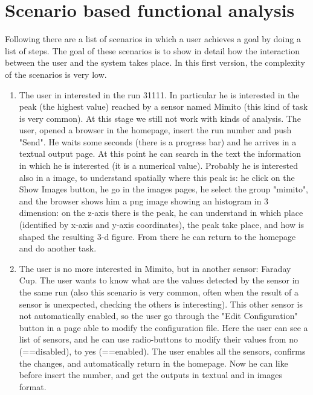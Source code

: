 \section{Scenario based functional analysis}

Following there are a list of scenarios in which a user achieves a goal by doing a list of steps. The goal of these scenarios is to show in detail how the interaction between the user and the system takes place. In this first version, the complexity of the scenarios is very low. 

\begin{enumerate}

\item The user in interested in the run 31111. In particular he is interested in the peak (the highest value) reached by a sensor named Mimito (this kind of task is very common). At this stage we still not work with kinds of analysis. The user, opened a browser in the homepage, insert the run number and push "Send". He waits some seconds (there is a progress bar) and he arrives in a textual output page. At this point he can search in the text the information in which he is interested (it is a numerical value). Probably he is interested also in a image, to understand spatially where this peak is: he click on the Show Images button, he go in the images pages, he select the group "mimito", and the browser shows him a png image showing an histogram in 3 dimension: on the z-axis there is the peak, he can understand in which place (identified by x-axis and y-axis coordinates), the peak take place, and how is shaped the resulting 3-d figure. From there he can return to the homepage and do another task.   

\item The user is no more interested in Mimito, but in another sensor: Faraday Cup. The user wants to know what are the values detected by the sensor in the same run (also this scenario is very common, often when the result of a sensor is unexpected, checking the others is interesting). This other sensor is not automatically enabled, so the user go through the "Edit Configuration" button in a page able to modify the configuration file. Here the user can see a list of sensors, and he can use radio-buttons to modify their values from no (==disabled), to yes (==enabled). The user enables all the sensors, confirms the changes, and automatically return in the homepage. Now he can like before insert the number, and get the outputs in textual and in images format.  



\end{enumerate}


